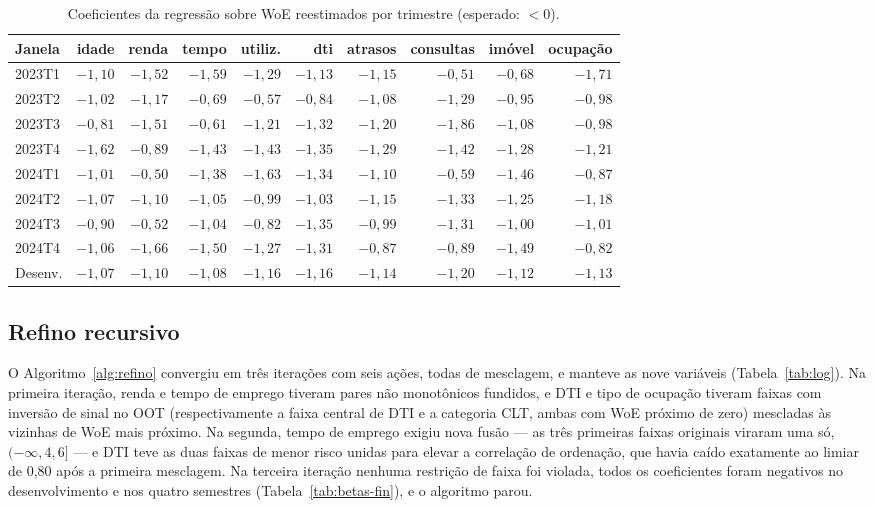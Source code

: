 \documentclass[11pt,a4paper]{article}
\begin{document}
\begin{table}[H]
\centering\footnotesize
\caption{Coeficientes da regressão sobre WoE reestimados por trimestre (esperado: $<0$).}
\label{tab:betas}
\setlength{\tabcolsep}{4pt}
\begin{tabular}{lrrrrrrrrr}
\toprule
Janela & idade & renda & tempo & utiliz. & dti & atrasos & consultas & imóvel & ocupação \\
\midrule
2023T1 & $-1{,}10$ & $-1{,}52$ & $-1{,}59$ & $-1{,}29$ & $-1{,}13$ & $-1{,}15$ & $-0{,}51$ & $-0{,}68$ & $-1{,}71$ \\
2023T2 & $-1{,}02$ & $-1{,}17$ & $-0{,}69$ & $-0{,}57$ & $-0{,}84$ & $-1{,}08$ & $-1{,}29$ & $-0{,}95$ & $-0{,}98$ \\
2023T3 & $-0{,}81$ & $-1{,}51$ & $-0{,}61$ & $-1{,}21$ & $-1{,}32$ & $-1{,}20$ & $-1{,}86$ & $-1{,}08$ & $-0{,}98$ \\
2023T4 & $-1{,}62$ & $-0{,}89$ & $-1{,}43$ & $-1{,}43$ & $-1{,}35$ & $-1{,}29$ & $-1{,}42$ & $-1{,}28$ & $-1{,}21$ \\
2024T1 & $-1{,}01$ & $-0{,}50$ & $-1{,}38$ & $-1{,}63$ & $-1{,}34$ & $-1{,}10$ & $-0{,}59$ & $-1{,}46$ & $-0{,}87$ \\
2024T2 & $-1{,}07$ & $-1{,}10$ & $-1{,}05$ & $-0{,}99$ & $-1{,}03$ & $-1{,}15$ & $-1{,}33$ & $-1{,}25$ & $-1{,}18$ \\
2024T3 & $-0{,}90$ & $-0{,}52$ & $-1{,}04$ & $-0{,}82$ & $-1{,}35$ & $-0{,}99$ & $-1{,}31$ & $-1{,}00$ & $-1{,}01$ \\
2024T4 & $-1{,}06$ & $-1{,}66$ & $-1{,}50$ & $-1{,}27$ & $-1{,}31$ & $-0{,}87$ & $-0{,}89$ & $-1{,}49$ & $-0{,}82$ \\
\midrule
Desenv. & $-1{,}07$ & $-1{,}10$ & $-1{,}08$ & $-1{,}16$ & $-1{,}16$ & $-1{,}14$ & $-1{,}20$ & $-1{,}12$ & $-1{,}13$ \\
\bottomrule
\end{tabular}
\end{table}

\subsection{Refino recursivo}
\label{sec:res-refino}

O Algoritmo~\ref{alg:refino} convergiu em três iterações com seis ações, todas de mesclagem, e manteve as nove variáveis (Tabela~\ref{tab:log}). Na primeira iteração, renda e tempo de emprego tiveram pares não monotônicos fundidos, e DTI e tipo de ocupação tiveram faixas com inversão de sinal no OOT (respectivamente a faixa central de DTI e a categoria CLT, ambas com WoE próximo de zero) mescladas às vizinhas de WoE mais próximo. Na segunda, tempo de emprego exigiu nova fusão --- as três primeiras faixas originais viraram uma só, $(-\infty, 4{,}6]$ --- e DTI teve as duas faixas de menor risco unidas para elevar a correlação de ordenação, que havia caído exatamente ao limiar de 0{,}80 após a primeira mesclagem. Na terceira iteração nenhuma restrição de faixa foi violada, todos os coeficientes foram negativos no desenvolvimento e nos quatro semestres (Tabela~\ref{tab:betas-fin}), e o algoritmo parou.
\end{document}
